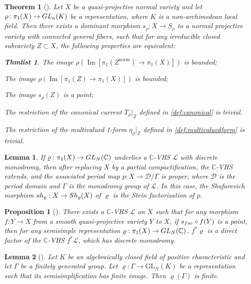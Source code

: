 \documentclass[10pt,a4paper]{amsart}
\newtheorem{thm}{Theorem}
\newtheorem{thmlist}{Thmlist}
\newtheorem{lem}{Lemma}
\newtheorem{proposition}{Proposition}
\newcommand{\GL}{{\rm GL}}
\newcommand{\bC}{\mathbb{C}}
\newcommand{\cL}{\mathcal L}
\newcommand{\sD}{\mathscr{D}}
\begin{document}
\begin{thm}[{\cite[Theorem E]{CDY22}}]\label{thm:KE}
	Let $X$ be a  quasi-projective normal variety and let $\rho \colon \pi_1(X) \to \GL_n(K)$ be a   representation, where $K$ is a non-archimedean local field. Then there exists a  dominant morphism $s_\rho \colon X \to S_\rho$ to a normal projective variety with connected general fibers, such that for any irreducible closed subvariety $Z \subset X$, the following properties are equivalent: 
	\begin{thmlist}
		\item \label{item:KZ1} The image $\rho(\operatorname{Im}[\pi_1(Z^{\mathrm{norm}}) \to \pi_1(X)])$ is bounded;
		\item \label{item:KZ3} The image $\rho(\operatorname{Im}[\pi_1(Z) \to \pi_1(X)])$ is bounded;
		\item \label{item:KZ2} The image $s_\rho(Z)$ is a point;
		\item \label{item:KZ4} The restriction of the canonical current $T_\rho|_Z$ defined in \cref{def:canonical} is trivial.
		\item  \label{item:KZ5} The restriction of the multivalued 1-form $\eta_\rho|_Z$ defined in \cref{def:multivaluedform} is trivial.
	\end{thmlist}   
\end{thm} 

\begin{lem}\label{lem:period}
	If   $\varrho:\pi_1(X)\to \GL_{N}(\bC)$ underlies a $\bC$-VHS $\cL$ with discrete monodromy, then after replacing $X$ by a partial compactification, the $\bC$-VHS extends, and the associated period map $p:X\to \sD/\Gamma$ is proper, where $\sD$ is the period domain and $\Gamma$ is the monodromy group of $\cL$. In this case, the Shafarevich morphism ${\rm sh}_\varrho:X\to {\rm Sh}_\varrho(X)$ of $\varrho$ is the Stein factorization of $p$.
\end{lem}

\begin{proposition}[{\cite[Proposition 3.13]{DY23}}]\label{prop:cons}
	There exists a $\bC$-VHS $\cL$ on $X$ such that for any morphism $f:Y\to X$ from a smooth quasi-projective variety $Y$ to $X$, if $s_{\rm fac}\circ f(Y)$ is a point, then for any semisimple representation $\varrho:\pi_1(X)\to \GL_{N}(\bC)$,  $f^*\varrho$ is a direct factor of the $\bC$-VHS $f^*\cL$, which has discrete monodromy.
\end{proposition}

\begin{lem}[{\cite[Lemma 3.1]{DY23b}}]\label{lem:finite group}
	Let $K$ be an algebraically closed field of positive characteristic and let $\Gamma$ be a finitely generated group. Let $\varrho:\Gamma\to \mathrm{GL}_N(K)$ be a representation such that its semisimplification has finite image. Then $\varrho(\Gamma)$ is finite.
\end{lem}
\end{document}
